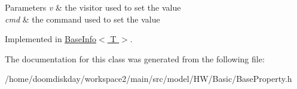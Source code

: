 \begin{DoxyParams}{Parameters}
{\em v} & the visitor used to set the value \\
\hline
{\em cmd} & the command used to set the value \\
\hline
\end{DoxyParams}


Implemented in \hyperlink{classBaseInfo_a84d4e0585478afa4fa067e7485a69159}{Base\+Info$<$ T $>$}.



The documentation for this class was generated from the following file\+:\begin{DoxyCompactItemize}
\item 
/home/doomdiskday/workspace2/main/src/model/\+H\+W/\+Basic/Base\+Property.\+h\end{DoxyCompactItemize}
